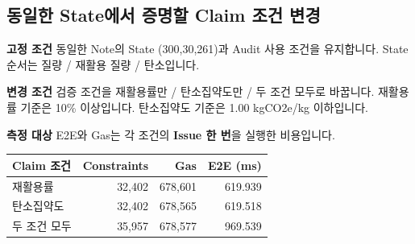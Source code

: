 \documentclass[11pt,a4paper]{article}
\begin{document}
\par\noindent\begin{minipage}{\linewidth}
\subsection*{동일한 State에서 증명할 Claim 조건 변경}
\textbf{고정 조건}\newline
동일한 Note의 State (300,30,261)과 Audit 사용 조건을 유지합니다.\newline
State 순서는 질량 / 재활용 질량 / 탄소입니다.\par\smallskip
\textbf{변경 조건}\newline
검증 조건을 재활용률만 / 탄소집약도만 / 두 조건 모두로 바꿉니다.\newline
재활용률 기준은 10\% 이상입니다.\newline
탄소집약도 기준은 1.00 kgCO2e/kg 이하입니다.\par\smallskip
\textbf{측정 대상}\newline
E2E와 Gas는 각 조건의 \textbf{Issue 한 번}을 실행한 비용입니다.\par\smallskip
\begin{center}\small\begin{tabular}{@{}lrrr@{}}\toprule
\textbf{Claim 조건} & \textbf{Constraints} & \textbf{Gas} & \textbf{E2E (ms)} \\
\midrule
재활용률 & 32,402 & 678,601 & 619.939 \\
탄소집약도 & 32,402 & 678,565 & 619.518 \\
두 조건 모두 & 35,957 & 678,577 & 969.539 \\
\bottomrule\end{tabular}\end{center}
\end{minipage}\par\medskip
\end{document}
